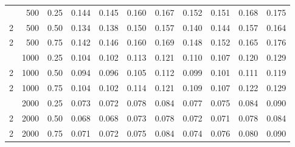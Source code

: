 \begin{table}[t]
\begin{tabular}{rrr rr rr rr rr}
\addlinespace
2 & 500 & 0.25 & 0.144 & 0.145 & 0.160 & 0.167 & 0.152 & 0.151 & 0.168 & 0.175 \\
2 & 500 & 0.50 & 0.134 & 0.138 & 0.150 & 0.157 & 0.140 & 0.144 & 0.157 & 0.164 \\
2 & 500 & 0.75 & 0.142 & 0.146 & 0.160 & 0.169 & 0.148 & 0.152 & 0.165 & 0.176 \\
\addlinespace
2 & 1000 & 0.25 & 0.104 & 0.102 & 0.113 & 0.121 & 0.110 & 0.107 & 0.120 & 0.129 \\
2 & 1000 & 0.50 & 0.094 & 0.096 & 0.105 & 0.112 & 0.099 & 0.101 & 0.111 & 0.119 \\
2 & 1000 & 0.75 & 0.104 & 0.102 & 0.114 & 0.121 & 0.109 & 0.107 & 0.122 & 0.129 \\
\addlinespace
2 & 2000 & 0.25 & 0.073 & 0.072 & 0.078 & 0.084 & 0.077 & 0.075 & 0.084 & 0.090 \\
2 & 2000 & 0.50 & 0.068 & 0.068 & 0.073 & 0.078 & 0.072 & 0.071 & 0.078 & 0.084 \\
2 & 2000 & 0.75 & 0.071 & 0.072 & 0.075 & 0.084 & 0.074 & 0.076 & 0.080 & 0.090 \\
\bottomrule\end{tabular}\end{table}
